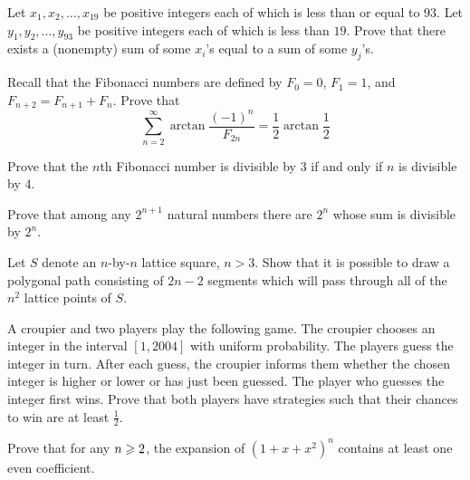 \documentclass{article}
\begin{document}
\begin{exercise}[1993 A4]
Let $x_1,x_2,\dots,x_{19}$ be positive integers each of which is less than or equal to $93$. Let $y_1,y_2,\dots,y_{93}$ be positive integers each of which is less than $19$. Prove that there exists a (nonempty) sum of some $x_{i}$'s equal to a sum of some $y_j$'s.
\end{exercise}

\begin{exercise}
    Recall that the Fibonacci numbers are defined by $F_0=0$, $F_1=1$, and $F_{n+2}=F_{n+1}+F_n$. Prove that
    \[\sum_{n=2}^\infty \arctan\frac{(-1)^n}{F_{2n}} = \frac{1}{2}\arctan{\frac{1}{2}}\]
\end{exercise}

\begin{exercise}
    Prove that the $n$th Fibonacci number is divisible by $3$ if and only if $n$ is divisible by $4$.
\end{exercise}

\begin{exercise}
    Prove that among any $2^{n+1}$ natural numbers there are $2^n$ whose sum is divisible by $2^n$.
\end{exercise}

\begin{exercise}
    Let $S$ denote an $n$-by-$n$ lattice square, $n >3$. Show that it is possible to draw a polygonal path consisting of $2n - 2$ segments which will pass through all of the $n^2$ lattice points of $S$.
\end{exercise}

\begin{exercise}
    A croupier and two players play the following game. The croupier chooses an integer in the interval $[1, 2004]$ with uniform probability. The players guess the integer in turn. After each guess, the croupier informs them whether the chosen integer is higher or lower or has just been guessed. The player who guesses the integer first wins. Prove that both players have strategies such that their chances to win are at least $\frac{1}{2}$.
\end{exercise}

\begin{exercise}
    Prove that for any $n\geqslant 2$, the expansion of $(1+x+x^2)^n$ contains at least one even coefficient.
\end{exercise}
\end{document}
